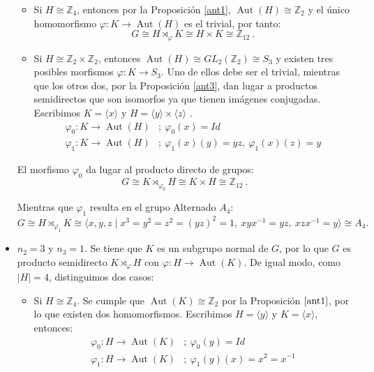 \begin{Ejemplo}
\begin{itemize}
        \begin{itemize}
            \setlength\itemsep{0.3em}
            \item Si $H \cong \mathbb{Z}_4$, entonces  por la Proposición \ref{ant1}, $\operatorname{Aut}(H) \cong \mathbb{Z}_2$ y el único homomorfismo $\varphi \colon K \to \operatorname{Aut}(H)$ es el trivial, por tanto:
            \[
               G \cong H \rtimes_{\varphi} K \cong H \times K \cong \mathbb{Z}_{12} \:.
            \]
            \item Si $H\cong \mathbb{Z}_2 \times \mathbb{Z}_2$, entonces $\operatorname{Aut}(H)\cong GL_2(\mathbb{Z}_2) \cong  S_3$ y existen tres posibles morfismos $\varphi \colon K \to S_3$. Uno de ellos debe ser el trivial, mientras que los otros dos, por la Proposición \ref{ant3}, dan lugar a productos semidirectos que son isomorfos ya que tienen imágenes conjugadas. 
            Escribimos $K = \langle x \rangle$ y $H = \langle y \rangle \times \langle z \rangle$ .
            \begin{align*}
            \varphi_{0} \colon K \rightarrow \operatorname{Aut}(H) &; \: \varphi_{0}(x)= Id \\
            \varphi_{1} \colon K \rightarrow \operatorname{Aut}(H) &; \: \varphi_{1}(x)(y)= yz, \: \varphi_{1}(x)(z)=y 
            \end{align*}
        \end{itemize}
        
    El morfismo $\varphi_0$ da lugar al producto directo de grupos:
    \[
        G \cong K \rtimes_{\varphi_0} H \cong K \times H \cong \mathbb{Z}_{12} \:.
    \]
    
    Mientras que $\varphi_1$ resulta en el grupo Alternado $A_4$:
    \[
    G \cong H \rtimes_{\varphi_{1}} K \cong \langle x,y,z \mid x^3 = y^2=z^2 = (yz)^2 = 1, \: xyx^{-1}=yz, \: xzx^{-1}=y  \rangle \cong A_4.
    \]
    
    
    \item $n_2=3$ y $n_3=1$. Se tiene que $K$ es un subgrupo normal de $G$, por lo que $G$ es producto semidirecto $K\rtimes_{\varphi} H$ con $\varphi \colon H \rightarrow \operatorname{Aut}(K)$. De igual modo, como $|H|=4$, distinguimos dos casos: 
    \vspace{0.2cm}        
        \begin{itemize}
            \setlength\itemsep{0.3em}
            \item Si $H \cong \mathbb{Z}_4$. Se cumple que $\operatorname{Aut}(K) \cong \mathbb{Z}_2$ por la Proposición $\ref{ant1}$, por lo que existen dos homomorfismos. Escribimos $H=\langle y \rangle$ y $K=\langle x \rangle$, entonces:
            \begin{align*}
            \varphi_{0} \colon H \rightarrow \operatorname{Aut}(K) &; \: \varphi_{0}(y)= Id \\
            \varphi_{1} \colon H \rightarrow \operatorname{Aut}(K) &; \: \varphi_{1}(y)(x) = x^2 = x^{-1} 
            \end{align*}
            

\end{itemize}
\end{itemize}
\end{Ejemplo}
